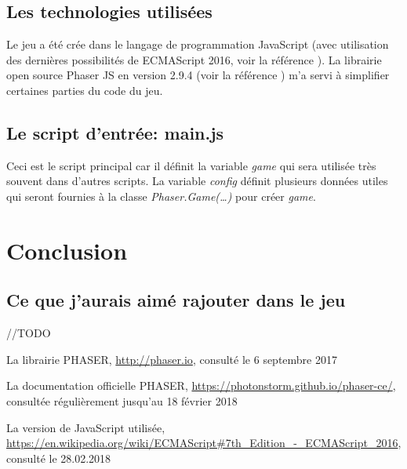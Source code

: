 \documentclass{article}
\begin{document}
        \subsection{Les technologies utilisées}
        Le jeu a été crée dans le langage de programmation JavaScript (avec utilisation des dernières possibilités de ECMAScript 2016, voir la référence \cite{ecma2016}). La librairie open source Phaser JS en version 2.9.4 (voir la référence \cite{phaser}) m'a servi à simplifier certaines parties du code du jeu.
        
       	
		\subsection{Le script d'entrée: main.js}
		
		Ceci est le script principal car il définit la variable \textit{game} qui sera utilisée très souvent dans d'autres scripts.
		La variable \textit{config} définit plusieurs données utiles qui seront fournies à la classe \textit{Phaser.Game(\dots)} pour créer \textit{game}.
        
        
        \section{Conclusion}
        \subsection{Ce que j'aurais aimé rajouter dans le jeu}
		//TODO
        
        \begin{thebibliography}{9}

  			La librairie PHASER,
  			\url{http://phaser.io},
  			consulté le 6 septembre 2017
  			
  			La documentation officielle PHASER,
  			\url{https://photonstorm.github.io/phaser-ce/},
  			consultée régulièrement jusqu'au 18 février 2018
  			
  			La version de JavaScript utilisée,
  			\url{https://en.wikipedia.org/wiki/ECMAScript#7th_Edition_-_ECMAScript_2016},
  			consulté le 28.02.2018
  			
		\end{thebibliography}
\end{document}
